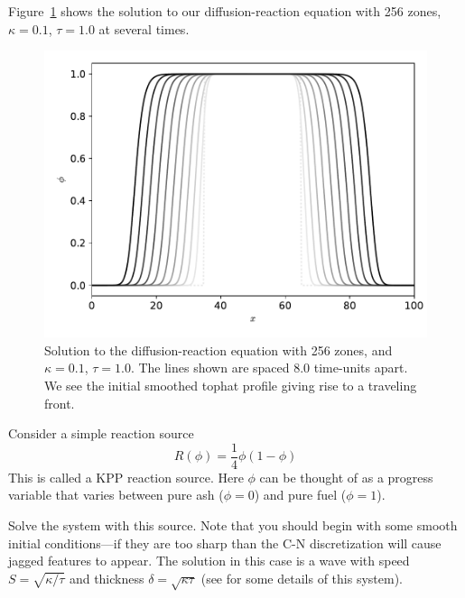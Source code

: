 Figure~\ref{fig:diffreact} shows the solution to our diffusion-reaction
equation with 256 zones, $\kappa = 0.1$, $\tau = 1.0$ at several times.

\begin{figure}[t]
\centering
\includegraphics[width=5.0in]{flame_seq}
\caption[Solution to the diffusion-reaction equation]
  {\label{fig:diffreact} Solution to the diffusion-reaction equation
   with 256 zones, and $\kappa = 0.1$, $\tau = 1.0$.  The lines shown
   are spaced 8.0 time-units apart.  We see the initial smoothed tophat
   profile giving rise to a traveling front. \\
   }
\end{figure}


\begin{exercise}
 Consider a simple reaction source
 \begin{equation}
 R(\phi) = \frac{1}{4} \phi (1 - \phi)
 \end{equation}
 This is called a KPP reaction source.
 Here $\phi$ can be thought of as a progress variable that varies
 between pure ash ($\phi = 0$) and pure fuel ($\phi = 1$).

 Solve the system with this source.  Note that you should begin with
 some smooth initial conditions---if they are too sharp than the 
 C-N discretization will cause jagged features to appear.  
 The solution in this case is a wave with speed $S = \sqrt{\kappa/\tau}$
 and thickness $\delta = \sqrt{\kappa \tau}$ (see \cite{vladimirova2006} for
 some details of this system).
\end{exercise}



